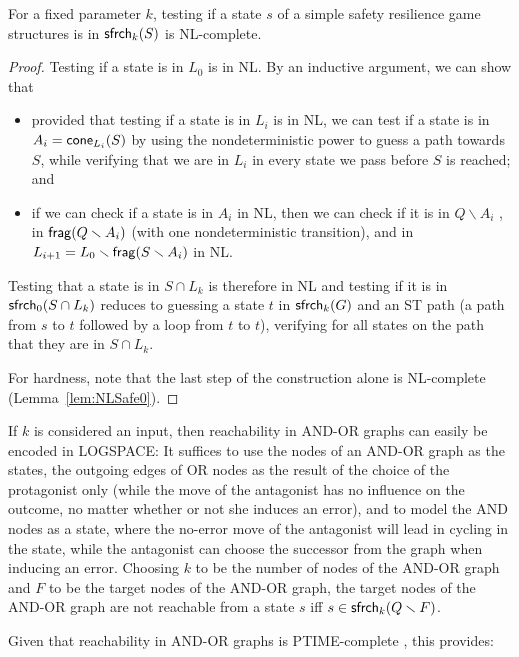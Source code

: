 \begin{lemma}
\label{lem:NLSafek}
For a fixed parameter $k$, testing if a state $s$ of a simple safety resilience game structures
 is in $\mathsf{sfrch}_k(S)$ is NL-complete.
\end{lemma}

\begin{proof}
Testing if a state is in $L_0$ is in NL.
%
By an inductive argument, we can show that
\begin{itemize}
\item provided that testing if a state is in $L_i$ is in NL,
we can test if a state is in $A_i = \mathsf{cone}_{L_i}(S)$ by using the nondeterministic power to guess a path towards $S$, while verifying that we are in $L_i$ in every state we pass before $S$ is reached; and
\item if we can check if a state is in $A_i$ in NL, then we can check if it is in $Q\smallsetminus A_i$ \cite{Immerman88}, in $\mathsf{frag}(Q\smallsetminus A_i)$ (with one nondeterministic transition), and in $L_{i+1}=L_0 \smallsetminus \mathsf{frag}(S\smallsetminus A_i)$ \cite{Immerman88} in NL.
\end{itemize}

Testing that a state is in $S \cap L_k$ is therefore in NL and testing if it is in $\mathsf{sfrch}_0(S \cap L_k)$ reduces to guessing a state $t$ in $\mathsf{sfrch}_k(G)$ and an ST path (a path from $s$ to $t$ followed by a loop from $t$ to $t$), verifying for all states on the path that they are in $S \cap L_k$.

For hardness, note that the last step of the construction alone is NL-complete (Lemma~\ref{lem:NLSafe0}).
\end{proof}

If $k$ is considered an input, then reachability in AND-OR graphs can easily be encoded in LOGSPACE:
It suffices to use the nodes of an AND-OR graph as the states, the outgoing edges of OR nodes as the result of the choice of the protagonist only (while the move of the antagonist has no influence on the outcome, no matter whether or not she induces an error), and to model the AND nodes as a state, where the no-error move of the antagonist will lead in cycling in the state, while the antagonist can choose the successor from the graph when inducing an error.
Choosing $k$ to be the number of nodes of the AND-OR graph and $F$ to be the target nodes of the AND-OR graph, the target nodes of the AND-OR graph are not reachable from a state $s$ iff $s \in \mathsf{sfrch}_k(Q\smallsetminus F)$.

Given that reachability in AND-OR graphs is PTIME-complete \cite{Immerman81}, this provides:

